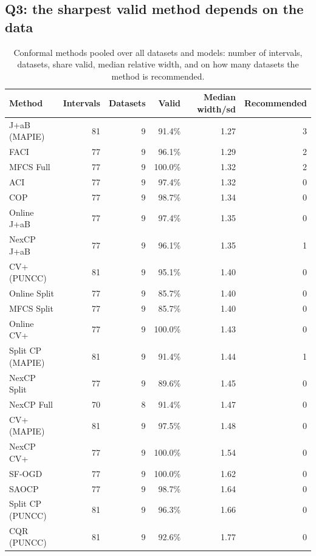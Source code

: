 \documentclass[11pt]{article}
\begin{document}
\subsection{Q3: the sharpest valid method depends on the data}
\begin{table}[t]\centering\small
\caption{Conformal methods pooled over all datasets and models: number of intervals, datasets, share valid, median relative width, and on how many datasets the method is recommended.}\label{tab:pool}
\begin{tabular}{lrrrrr}\toprule Method & Intervals & Datasets & Valid & Median width/sd & Recommended\\\midrule
J+aB (MAPIE) & 81 & 9 & 91.4\% & 1.27 & 3\\
FACI & 77 & 9 & 96.1\% & 1.29 & 2\\
MFCS Full & 77 & 9 & 100.0\% & 1.32 & 2\\
ACI & 77 & 9 & 97.4\% & 1.32 & 0\\
COP & 77 & 9 & 98.7\% & 1.34 & 0\\
Online J+aB & 77 & 9 & 97.4\% & 1.35 & 0\\
NexCP J+aB & 77 & 9 & 96.1\% & 1.35 & 1\\
CV+ (PUNCC) & 81 & 9 & 95.1\% & 1.40 & 0\\
Online Split & 77 & 9 & 85.7\% & 1.40 & 0\\
MFCS Split & 77 & 9 & 85.7\% & 1.40 & 0\\
Online CV+ & 77 & 9 & 100.0\% & 1.43 & 0\\
Split CP (MAPIE) & 81 & 9 & 91.4\% & 1.44 & 1\\
NexCP Split & 77 & 9 & 89.6\% & 1.45 & 0\\
NexCP Full & 70 & 8 & 91.4\% & 1.47 & 0\\
CV+ (MAPIE) & 81 & 9 & 97.5\% & 1.48 & 0\\
NexCP CV+ & 77 & 9 & 100.0\% & 1.54 & 0\\
SF-OGD & 77 & 9 & 100.0\% & 1.62 & 0\\
SAOCP & 77 & 9 & 98.7\% & 1.64 & 0\\
Split CP (PUNCC) & 81 & 9 & 96.3\% & 1.66 & 0\\
CQR (PUNCC) & 81 & 9 & 92.6\% & 1.77 & 0\\
\bottomrule\end{tabular}\end{table}\begin{table}[t]\centering\small
\caption{Recommended method per dataset: the narrowest method that is valid on at least 75\% of the base models it wraps.}\label{tab:rec}

\end{table}
\end{document}
